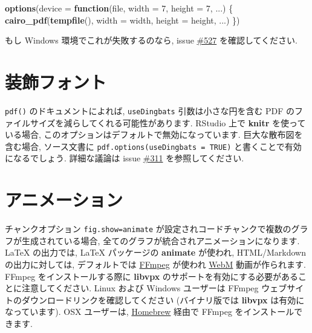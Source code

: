 \documentclass[
  lualatex,ja=standard,jafont=noto-otf]{bxjsreport}
\newenvironment{Shaded}{\begin{snugshade}}{\end{snugshade}}
\newcommand{\AttributeTok}[1]{\textcolor[rgb]{0.13,0.29,0.53}{#1}}
\newcommand{\ControlFlowTok}[1]{\textcolor[rgb]{0.13,0.29,0.53}{\textbf{#1}}}
\newcommand{\DecValTok}[1]{\textcolor[rgb]{0.00,0.00,0.81}{#1}}
\newcommand{\FunctionTok}[1]{\textcolor[rgb]{0.13,0.29,0.53}{\textbf{#1}}}
\newcommand{\NormalTok}[1]{#1}
\begin{document}
\begin{Shaded}
\begin{Highlighting}[numbers=left,,]
\FunctionTok{options}\NormalTok{(}\AttributeTok{device =} \ControlFlowTok{function}\NormalTok{(file, }\AttributeTok{width =} \DecValTok{7}\NormalTok{, }\AttributeTok{height =} \DecValTok{7}\NormalTok{, ...) \{}
  \FunctionTok{cairo\_pdf}\NormalTok{(}\FunctionTok{tempfile}\NormalTok{(), }\AttributeTok{width =}\NormalTok{ width, }\AttributeTok{height =}\NormalTok{ height, ...)}
\NormalTok{\})}
\end{Highlighting}
\end{Shaded}

もし Windows 環境でこれが失敗するのなら, issue
\href{https://github.com/yihui/knitr/issues/527}{\#527}
を確認してください.

\hypertarget{ux88c5ux98feux30d5ux30a9ux30f3ux30c8}{%
\section*{装飾フォント}\label{ux88c5ux98feux30d5ux30a9ux30f3ux30c8}}

\texttt{pdf()} のドキュメントによれば, \texttt{useDingbats}
引数は小さな円を含む PDF
のファイルサイズを減らしてくれる可能性があります. RStudio 上で
\textbf{knitr} を使っている場合,
このオプションはデフォルトで無効になっています. 巨大な散布図を含む場合,
ソース文書に \texttt{pdf.options(useDingbats\ =\ TRUE)}
と書くことで有効になるでしょう. 詳細な議論は issue
\href{https://github.com/yihui/knitr/issues/311}{\#311}
を参照してください.

\hypertarget{ux30a2ux30cbux30e1ux30fcux30b7ux30e7ux30f3}{%
\section*{アニメーション}\label{ux30a2ux30cbux30e1ux30fcux30b7ux30e7ux30f3}}

チャンクオプション
\texttt{fig.show=\textquotesingle{}animate\textquotesingle{}}
が設定されコードチャンクで複数のグラフが生成されている場合,
全てのグラフが統合されアニメーションになります. LaTeX の出力では, LaTeX
パッケージの \textbf{animate} が使われ, HTML/Markdown の出力に対しては,
デフォルトでは \href{http://ffmpeg.org}{FFmpeg} が使われ
\href{http://www.webmproject.org}{WebM} 動画が作られます. FFmpeg
をインストールする際に \textbf{libvpx}
のサポートを有効にする必要があることに注意してください. Linux および
Windows ユーザーは FFmpeg
ウェブサイトのダウンロードリンクを確認してください (バイナリ版では
\textbf{libvpx} は有効になっています). OSX ユーザーは,
\href{http://brew.sh}{Homebrew} 経由で FFmpeg をインストールできます.
\end{document}
